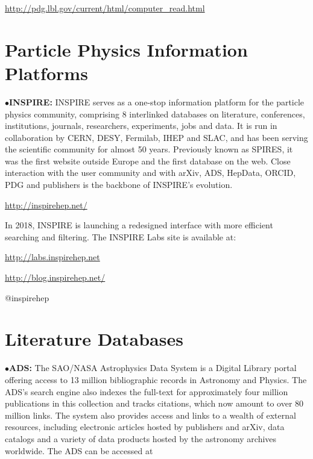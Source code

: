            \item{}\qquad\url{http://pdg.lbl.gov/current/html/computer\_read.html}

\section{Particle Physics Information Platforms}%


\item{$\bullet$}{\bf INSPIRE:}
INSPIRE serves as a one-stop information platform for the particle physics community, comprising 8 interlinked databases on literature, conferences, institutions, journals, researchers, experiments, jobs and data. It is run in collaboration by CERN, DESY, Fermilab, IHEP and SLAC, and has been serving the scientific community for almost 50 years. Previously known as SPIRES, it was the first website outside Europe and the first database on the web. Close interaction with the user community and with arXiv, ADS, HepData, ORCID, PDG and publishers is the backbone of INSPIRE’s evolution. 
	\item{}\qquad\url{http://inspirehep.net/}

\item{}In 2018, INSPIRE is launching a redesigned interface with more efficient searching and filtering. The INSPIRE Labs site is available at:

	\item{}\qquad\url{http://labs.inspirehep.net}
	\item{} \url{http://blog.inspirehep.net/}
	\item{} @inspirehep


\vglue -0.1in
\section{Literature Databases}%

\item{$\bullet$}{\bf ADS:} 
The SAO/NASA Astrophysics Data System is a Digital Library portal offering access to 13 million bibliographic records in Astronomy and Physics.  The ADS's search engine also indexes the full-text for approximately four million publications in this collection and tracks citations, which now amount to over 80 million links.  The system also provides access and links to a wealth of external resources, including electronic articles hosted by publishers and arXiv, data catalogs and a variety of data products hosted by the astronomy archives worldwide.  The ADS can be accessed at

